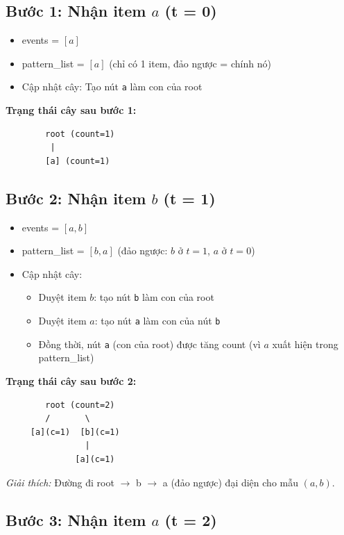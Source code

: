 \documentclass[a4paper,12pt]{report}
\begin{document}
\subsection{Bước 1: Nhận item $a$ (t = 0)}

\begin{itemize}
    \item events = $[a]$
    \item pattern\_list = $[a]$ (chỉ có 1 item, đảo ngược = chính nó)
    \item Cập nhật cây: Tạo nút \texttt{a} làm con của root
\end{itemize}

\textbf{Trạng thái cây sau bước 1:}
\begin{verbatim}
        root (count=1)
         |
        [a] (count=1)
\end{verbatim}

\subsection{Bước 2: Nhận item $b$ (t = 1)}

\begin{itemize}
    \item events = $[a, b]$
    \item pattern\_list = $[b, a]$ (đảo ngược: $b$ ở $t=1$, $a$ ở $t=0$)
    \item Cập nhật cây:
    \begin{itemize}
        \item Duyệt item $b$: tạo nút \texttt{b} làm con của root
        \item Duyệt item $a$: tạo nút \texttt{a} làm con của nút \texttt{b}
        \item Đồng thời, nút \texttt{a} (con của root) được tăng count (vì $a$ xuất hiện trong pattern\_list)
    \end{itemize}
\end{itemize}

\textbf{Trạng thái cây sau bước 2:}
\begin{verbatim}
        root (count=2)
        /       \
     [a](c=1)  [b](c=1)
                |
              [a](c=1)
\end{verbatim}

\textit{Giải thích:} Đường đi root $\rightarrow$ b $\rightarrow$ a (đảo ngược) đại diện cho mẫu $(a, b)$.

\subsection{Bước 3: Nhận item $a$ (t = 2)}
\end{document}
